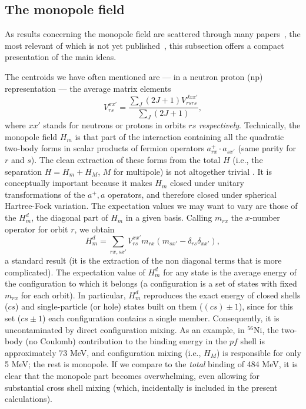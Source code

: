 \begin{multicols}{2}
\subsection{The monopole field}

As results concerning the monopole field are scattered through many
papers~\cite{acz,mdz,zuk94,jdz95}, the most relevant of which is not
yet published~\cite{dz98}, this subsection offers a compact
presentation of the main ideas.

The centroids we have often mentioned are --- in a neutron proton (np)
representation --- the average matrix elements
\begin{equation}
 V^{xx'}_{rs}=\frac{\sum_J (2J+1)V^{Jxx'}_{rsrs}}{ \sum_J
  (2J+1)},
\end{equation}
where $xx'$ stands for neutrons or protons in orbits $rs$ {\em
  respectively}. Technically, the monopole field $H_m$ is that part of
the interaction containing all the quadratic two-body forms in scalar
products of fermion operators $a^+_{rx}\cdot a_{sx'}$ (same parity for
$r$ and $s$). The clean extraction of these forms from the total $H$
  (i.e., the separation $H=H_m+H_M$, $M$ for multipole)
is not altogether trivial \cite{zuk94}. It is conceptually important
because it makes $H_m$ closed under unitary transformations of the
$a^+,a$ operators, and therefore closed
under spherical Hartree-Fock
variation. The expectation values we may want to vary are those of the
$H_m^d$, the diagonal part of $H_m$ in a given basis.  Calling
$m_{rx}$ the $x$-number operator for orbit $r$, we obtain
\begin{equation}
\label{hm}
H_m^d= \sum_{rx,sx'}
V^{xx'}_{rs}m_{rx}(m_{sx'}-{\delta}_{rs}{\delta}_{xx'}),
\end{equation}
a standard result (it is the extraction of the non diagonal terms that
is more complicated). The expectation value of $H_m^d$ for any state is the
average energy of the configuration to which it belongs (a
configuration is a set of states with fixed $m_{rx}$ for each orbit).
In particular, $H_m^d$ reproduces the exact energy of closed shells
($cs$) and single-particle (or hole) states built on them ($(cs)\pm
1$), since for this set ($cs\pm 1$) each configuration contains a
single member. Consequently, it is uncontaminated by direct
configuration mixing. As an example, in $^{56}$Ni, the two-body (no
Coulomb) contribution to the binding energy in the $pf$ shell is approximately
73 MeV, and configuration mixing (i.e., $H_M$) is responsible for
only 5 MeV; the rest is monopole. If we compare to the {\em total}
binding of 484 MeV, it is clear that the monopole part becomes
overwhelming, even allowing for substantial cross shell mixing (which,
incidentally is included in the present calculations).


\end{multicols}
